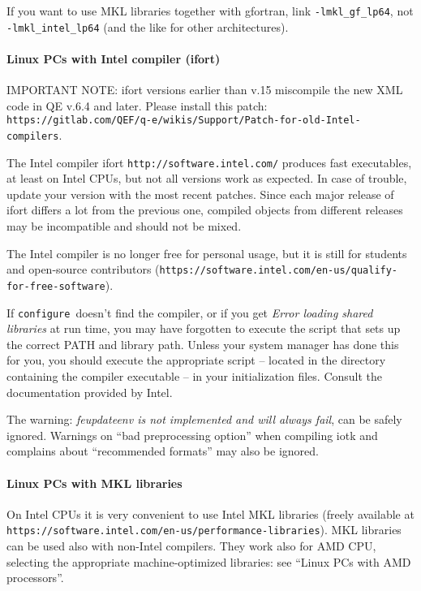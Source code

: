 \documentclass[12pt,a4paper]{article}
\def\configure{\texttt{configure}}
\begin{document}
If you want to use MKL libraries together with gfortran, 
link \texttt{-lmkl\_gf\_lp64}, not \texttt{-lmkl\_intel\_lp64}
(and the like for other architectures).

\paragraph{Linux PCs with Intel compiler (ifort)}

IMPORTANT NOTE: ifort versions earlier than v.15 miscompile the new
XML code in QE v.6.4 and later. Please install this patch:\\
\texttt{https://gitlab.com/QEF/q-e/wikis/Support/Patch-for-old-Intel-compilers}.

The Intel compiler ifort \texttt{http://software.intel.com/}
produces fast executables, at least on Intel CPUs, but not all versions
work as expected. In case of trouble, update your version
with the most recent patches. Since each major release of ifort
differs a lot from the previous one, compiled objects from different
releases may be incompatible and should not be mixed.

The Intel compiler is no longer free for personal usage, but it is still
for students and open-source contributors
(\texttt{https://software.intel.com/en-us/qualify-for-free-software}).

If \configure\ doesn't find the compiler, or if you get
{\em Error loading shared libraries} at run time, you may have
forgotten to execute the script that
sets up the correct PATH and library path. Unless your system manager has
done this for you, you should execute the appropriate script -- located in
the directory containing the compiler executable -- in your
initialization files. Consult the documentation provided by Intel.

The warning: {\em feupdateenv is not implemented and will always fail},
can be safely ignored. Warnings on ``bad preprocessing option'' when compiling
iotk and complains about ``recommended formats'' may also be ignored.

\paragraph{Linux PCs with MKL libraries}
On Intel CPUs it is very convenient to use Intel MKL libraries
(freely available at
\texttt{https://software.intel.com/en-us/performance-libraries}).
MKL libraries can be used also with non-Intel compilers.
They work also for AMD CPU, selecting the appropriate machine-optimized
libraries: see ``Linux PCs with AMD processors''.
\end{document}
